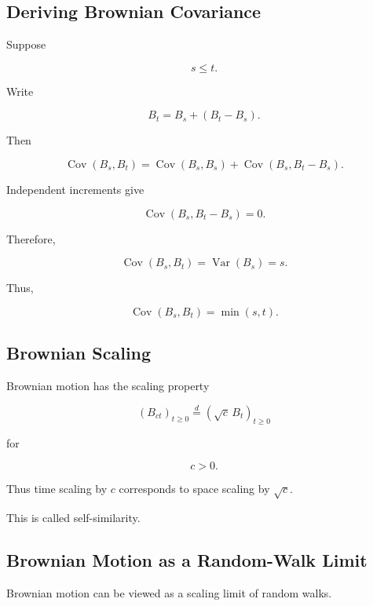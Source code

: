 \subsection{Deriving Brownian Covariance}
\label{subsec:derive-brownian-covariance}

Suppose

\[
s\leq t.
\]

Write

\[
B_t
=
B_s+(B_t-B_s).
\]

Then

\[
\operatorname{Cov}(B_s,B_t)
=
\operatorname{Cov}(B_s,B_s)
+
\operatorname{Cov}(B_s,B_t-B_s).
\]

Independent increments give

\[
\operatorname{Cov}(B_s,B_t-B_s)=0.
\]

Therefore,

\[
\operatorname{Cov}(B_s,B_t)
=
\operatorname{Var}(B_s)
=
s.
\]

Thus,

\[
\boxed{
\operatorname{Cov}(B_s,B_t)
=
\min(s,t).
}
\]

\subsection{Brownian Scaling}
\label{subsec:brownian-scaling}

Brownian motion has the scaling property

\[
\boxed{
(B_{ct})_{t\geq0}
\overset{d}{=}
(\sqrt{c}\,B_t)_{t\geq0}
}
\]

for

\[
c>0.
\]

Thus time scaling by \(c\) corresponds to space scaling by
\(\sqrt{c}\).

This is called self-similarity.

\subsection{Brownian Motion as a Random-Walk Limit}
\label{subsec:brownian-random-walk-limit}

Brownian motion can be viewed as a scaling limit of random walks.

